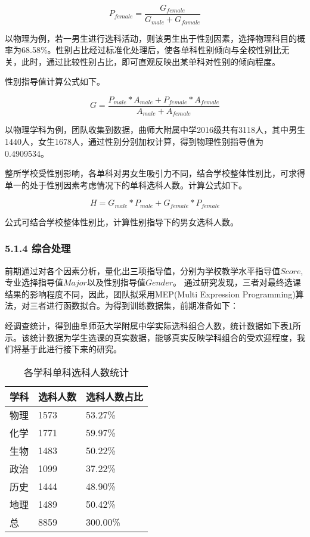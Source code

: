 \documentclass[bwprint]{cumcmthesis}
\begin{document}
\begin{equation}
P_{female} = \frac{G_{female}}{G_{male}+G_{famale}}
\end{equation}

以物理为例，若一男生进行选科活动，则该男生出于性别因素，选择物理科目的概率为68.58\%。性别占比经过标准化处理后，使各单科性别倾向与全校性别比无关，此时，通过比较性别占比，即可直观反映出某单科对性别的倾向程度。

性别指导值计算公式如下。

\begin{equation}
\label{gender}
G = \frac{P_{male}*A_{male}+P_{female}*A_{female}}{A_{male}+A_{female}}
\end{equation}

以物理学科为例，团队收集到数据，曲师大附属中学2016级共有3118人，其中男生1440人，女生1678人，通过性别分别加权计算，得到物理性别指导值为0.4909534。

整所学校受性别影响，各单科对男女生吸引力不同，结合学校整体性别比，可求得单一的处于性别因素考虑情况下的单科选科人数。计算公式如下。

\begin{equation}
H = G_{male}*P_{male} + G_{female}*P_{female}
\end{equation}


公式可结合学校整体性别比，计算性别指导下的男女选科人数。

\subsubsection{5.1.4 综合处理}

前期通过对各个因素分析，量化出三项指导值，分别为学校教学水平指导值$ Score $,专业选择指导值$ Major $以及性别指导值$ Gender $。
通过研究发现，三者对最终选课结果的影响程度不同，因此，团队拟采用MEP(Multi Expression Programming)算法，对三者进行函数拟合。为得到训练数据集，前期准备如下：

经调查统计，得到曲阜师范大学附属中学实际选科组合人数，统计数据如下表\ref{tab:school_per_select}所示。该统计数据为学生选课的真实数据，能够真实反映学科组合的受欢迎程度，我们将基于此进行接下来的研究。


\begin{longtable}{p{2.5cm}p{2.5cm}p{4cm}}
	\caption{\label{tab:school_per_select}各学科单科选科人数统计}\\
	\toprule
	学科    & 选科人数  & 选科人数占比 \\
	\midrule
	物理    & 1573  & 53.27\% \\
	化学    & 1771  & 59.97\% \\
	生物    & 1483  & 50.22\% \\
	政治    & 1099  & 37.22\% \\
	历史    & 1444  & 48.90\% \\
	地理    & 1489  & 50.42\% \\
	\midrule
	总     & 8859  & 300.00\% \\
	\bottomrule
\end{longtable}%
\end{document}
